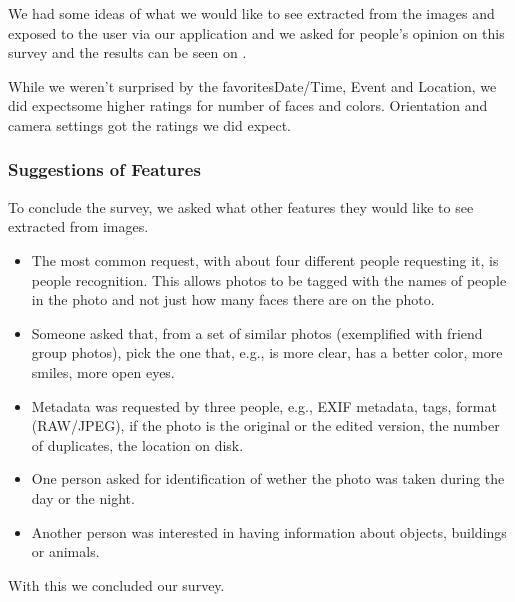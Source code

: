 We had some ideas of what we would like to see extracted from the images and exposed to the user via our application and we asked for people's opinion on this survey and the results can be seen on .

While we weren't surprised by the favorites\linebreak Date/Time, Event and Location, we did expect\linebreak some higher ratings for number of faces and colors. Orientation and camera settings got the ratings we did expect.




\subsubsection{Suggestions of Features} %
\label{ssub:suggestions_of_features}

To conclude the survey, we asked what other features they would like to see extracted from images.

\begin{itemize}

	\item The most common request, with about four different people requesting it, is people recognition. This allows photos to be tagged with the names of people in the photo and not just how many faces there are on the photo.


	\item Someone asked that, from a set of similar photos (exemplified with friend group photos), pick the one that, e.g., is more clear, has a better color, more smiles, more open eyes.


	\item Metadata was requested by three people, e.g., EXIF metadata, tags, format (RAW/JPEG), if the photo is the original or the edited version, the number of duplicates, the location on disk.


	\item One person asked for identification of wether the photo was taken during the day or the night.


	\item Another person was interested in having information about objects, buildings or animals.
\end{itemize}

\vspace{\baselineskip}

With this we concluded our survey.
















\cleardoublepage

